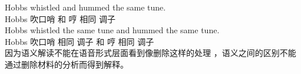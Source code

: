 \eal
\ex\label{ex-whistled-a} 
\gll Hobbs whistled and hummed the same tune.\\
Hobbs 吹口哨 和 哼  相同 调子\\
\ex\label{ex-whistled-b} 
\gll Hobbs whistled the same tune and hummed the same tune.\\
Hobbs 吹口哨  相同 调子 和 哼  相同 调子\\
\zl
因为语义解读不能在语音形式层面看到像删除这样的处理 \citep[第3章]{Chomsky95a-u}，语义之间的区别不能通过删除材料的分析而得到解释。

